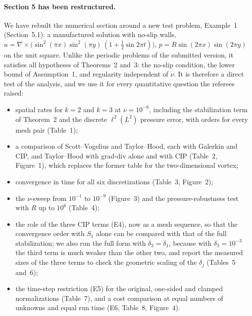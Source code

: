 
\paragraph{Section 5 has been restructured.}
We have rebuilt the numerical section around a new test problem, Example~1 (Section~5.1): a
manufactured solution with no-slip walls,
$u=\nabla\times\bigl(\sin^2(\pi x)\sin^2(\pi y)\,(1+\tfrac12\sin2\pi t)\bigr)$,
$p=R\sin(2\pi x)\sin(2\pi y)$ on the unit square. Unlike the periodic problems of the submitted
version, it satisfies all hypotheses of Theorems~2 and~3: the no-slip condition, the lower
bound of Assumption~1, and regularity independent of $\nu$. It is therefore a direct test of
the analysis, and we use it for every quantitative question the referees raised:
\begin{itemize}
\item spatial rates for $k=2$ and $k=3$ at $\nu=10^{-8}$, including the stabilization term of
      Theorem~2 and the discrete $\ell^2(L^2)$ pressure error, with orders for every mesh pair
      (Table~1);
\item a comparison of Scott--Vogelius and Taylor--Hood, each with Galerkin and CIP, and Taylor--Hood
      with grad-div alone and with CIP (Table~2, Figure~1), which replaces the former table for the
      two-dimensional vortex;
\item convergence in time for all six discretizations (Table~3, Figure~2);
\item the $\nu$-sweep from $10^{-1}$ to $10^{-9}$ (Figure~3) and the pressure-robustness test with
      $R$ up to $10^6$ (Table~4);
\item the role of the three CIP terms (E4), now as a mesh sequence, so that the convergence order
      with $S_1$ alone can be compared with that of the full stabilization; we also run the full
      form with $\delta_3=\delta_1$, because with $\delta_3=10^{-3}$ the third term is much weaker than
      the other two, and report the measured sizes of the three terms to check the geometric
      scaling of the $\delta_j$ (Tables~5 and~6);
\item the time-step restriction (E5) for the original, one-sided and clamped normalizations
      (Table~7), and a cost comparison at equal numbers of unknowns and equal run time (E6, Table~8,
      Figure~4).
\end{itemize}
